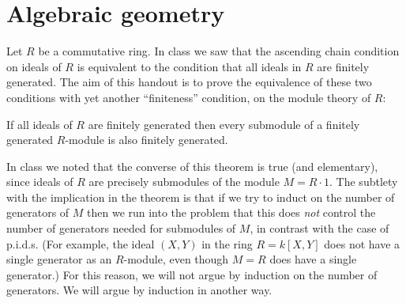 \chapter{Algebraic geometry}
Let \(R\) be a commutative ring. In class we saw that the ascending chain
condition on ideals of \(R\) is equivalent to the condition that all ideals
in \(R\) are finitely generated. The aim of this handout is to prove the
equivalence of these two conditions with yet another ``finiteness''
condition, on the module theory of \(R\):
\begin{theorem}
  If all ideals of \(R\) are finitely generated then every submodule of a
  finitely generated \(R\)-module is also finitely generated.
\end{theorem}

In class we noted that the converse of this theorem is true (and
elementary), since ideals of \(R\) are precisely submodules of the module
\(M=R\cdot 1\). The subtlety with the implication in the theorem is that if
we try to induct on the number of generators of \(M\) then we run into the
problem that this does \emph{not} control the number of generators needed
for submodules of \(M\), in contrast with the case of p.i.d.s. (For
example, the ideal \((X,Y)\) in the ring \(R=k[X,Y]\) does not have a
single generator as an \(R\)-module, even though \(M=R\) does have a single
generator.) For this reason, we will not argue by induction on the number
of generators. We will argue by induction in another way.

